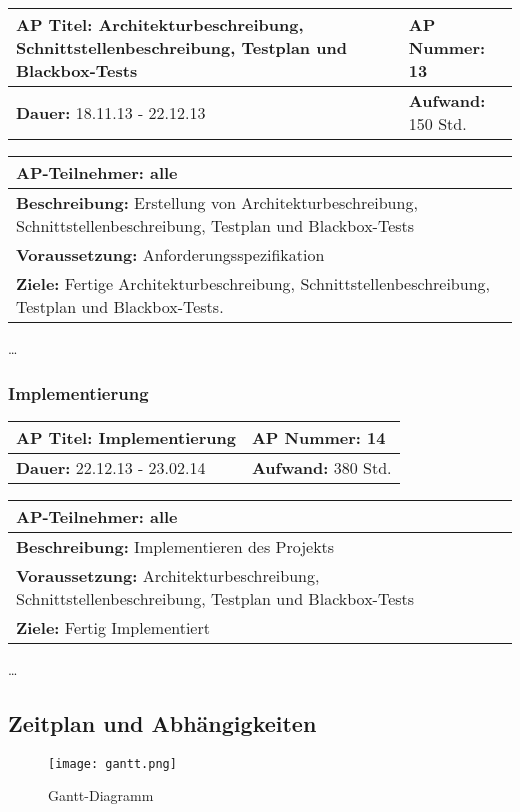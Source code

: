\begin{tabular}{|p{7.43cm}|p{7.43cm}|}
\hline
\textbf{AP Titel: }Architekturbeschreibung, Schnittstellenbeschreibung, Testplan und Blackbox-Tests & \textbf{AP Nummer: }13\\ 
\hline
\textbf{Dauer: }18.11.13 - 22.12.13& \textbf{Aufwand: }150 Std.\\
\hline
\end{tabular}
\begin{tabular}{|p{15.3cm}|}
\hline
\textbf{AP-Teilnehmer: }alle\\
\hline
\textbf{Beschreibung: }Erstellung von Architekturbeschreibung, Schnittstellenbeschreibung, Testplan und Blackbox-Tests\\
\hline
\textbf{Voraussetzung: }Anforderungsspezifikation\\
\hline 
\textbf{Ziele: }Fertige Architekturbeschreibung, Schnittstellenbeschreibung, Testplan und Blackbox-Tests.\\
\hline 
\end{tabular}


\ldots

\subsubsection{Implementierung}

\begin{tabular}{|p{7.43cm}|p{7.43cm}|}
\hline
\textbf{AP Titel: }Implementierung & \textbf{AP Nummer: }14\\ 
\hline
\textbf{Dauer: }22.12.13 - 23.02.14& \textbf{Aufwand: } 380 Std.\\
\hline
\end{tabular}
\begin{tabular}{|p{15.3cm}|}
\hline
\textbf{AP-Teilnehmer: }alle\\
\hline
\textbf{Beschreibung: }Implementieren des Projekts\\
\hline
\textbf{Voraussetzung: }Architekturbeschreibung, Schnittstellenbeschreibung, Testplan und Blackbox-Tests \\
\hline 
\textbf{Ziele: }Fertig Implementiert\\
\hline 
\end{tabular}

\ldots

\subsection{Zeitplan und Abhängigkeiten}
\newpage
\begin{figure}[H]
\centering
\texttt{[image: gantt.png]}
\caption{Gantt-Diagramm}
\end{figure}

